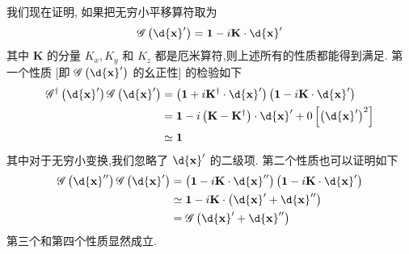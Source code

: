 	我们现在证明, 如果把无穷小平移算符取为
	\begin{equation}\label{1.159}
		\mathscr{G}\left( {\d{\mathbf{x}}^{\prime }}\right) = \textbf{1} - i\mathbf{K} \cdot \d{\mathbf{x}}^{\prime }
	\end{equation}
	其中 $\mathbf{K}$ 的分量 ${K}_{x},{K}_{y}$ 和 ${K}_{z}$ 都是厄米算符,则上述所有的性质都能得到满足. 第一个性质 [即 $\mathscr{G}\left( {\d{\mathbf{x}}^{\prime }}\right)$ 的幺正性] 的检验如下
	\begin{equation}
		\begin{aligned}
			{\mathscr{G}}^{ \dagger }\left( {\d{\mathbf{x}}^{\prime }}\right) \mathscr{G}\left( {\d{\mathbf{x}}^{\prime }}\right) &= \left( {\textbf{1} + i{\mathbf{K}}^{ \dagger } \cdot \d{\mathbf{x}}^{\prime }}\right) \left( {\textbf{1} - i\mathbf{K} \cdot \d{\mathbf{x}}^{\prime }}\right)\\
			&= \textbf{1} - i\left( {\mathbf{K} - {\mathbf{K}}^{ \dagger }}\right) \cdot \d{\mathbf{x}}^{\prime } + 0\left\lbrack {\left( \d{\mathbf{x}}^{\prime }\right) }^{2}\right\rbrack\\
			&\simeq \textbf{1}
		\end{aligned}
	\end{equation}
	其中对于无穷小变换,我们忽略了 $\d{\mathbf{x}}^{\prime }$ 的二级项. 第二个性质也可以证明如下
	\begin{equation}
		\begin{aligned}
			\mathscr{G}\left( {\d{\mathbf{x}}^{\prime \prime }}\right) \mathscr{G}\left( {\d{\mathbf{x}}^{\prime }}\right) &= \left( {\textbf{1} - i\mathbf{K} \cdot \d{\mathbf{x}}^{\prime \prime }}\right) \left( {\textbf{1} - i\mathbf{K} \cdot \d{\mathbf{x}}^{\prime }}\right)\\
			&\simeq \textbf{1} - i\mathbf{K} \cdot \left( {\d{\mathbf{x}}^{\prime } + \d{\mathbf{x}}^{\prime \prime }}\right) \\
			&= \mathscr{G}\left( {\d{\mathbf{x}}^{\prime } + \d{\mathbf{x}}^{\prime \prime }}\right)
		\end{aligned}
	\end{equation}
	第三个和第四个性质显然成立.
	
